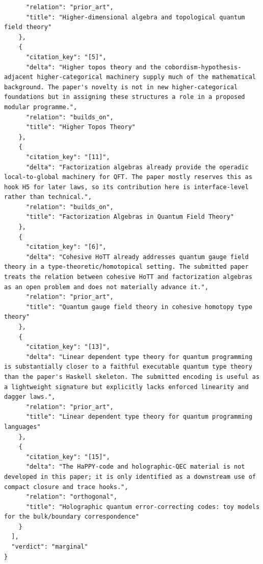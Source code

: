 \documentclass[11pt]{article}
\begin{document}
\begin{verbatim}
      "relation": "prior_art",
      "title": "Higher-dimensional algebra and topological quantum field theory"
    },
    {
      "citation_key": "[5]",
      "delta": "Higher topos theory and the cobordism-hypothesis-adjacent higher-categorical machinery supply much of the mathematical background. The paper's novelty is not in new higher-categorical foundations but in assigning these structures a role in a proposed modular programme.",
      "relation": "builds_on",
      "title": "Higher Topos Theory"
    },
    {
      "citation_key": "[11]",
      "delta": "Factorization algebras already provide the operadic local-to-global machinery for QFT. The paper mostly reserves this as hook H5 for later laws, so its contribution here is interface-level rather than technical.",
      "relation": "builds_on",
      "title": "Factorization Algebras in Quantum Field Theory"
    },
    {
      "citation_key": "[6]",
      "delta": "Cohesive HoTT already addresses quantum gauge field theory in a type-theoretic/homotopical setting. The submitted paper treats the relation between cohesive HoTT and factorization algebras as an open problem and does not materially advance it.",
      "relation": "prior_art",
      "title": "Quantum gauge field theory in cohesive homotopy type theory"
    },
    {
      "citation_key": "[13]",
      "delta": "Linear dependent type theory for quantum programming is substantially closer to a faithful executable quantum type theory than the paper's Haskell skeleton. The submitted encoding is useful as a lightweight signature but explicitly lacks enforced linearity and dagger laws.",
      "relation": "prior_art",
      "title": "Linear dependent type theory for quantum programming languages"
    },
    {
      "citation_key": "[15]",
      "delta": "The HaPPY-code and holographic-QEC material is not developed in this paper; it is only identified as a downstream use of compact closure and trace hooks.",
      "relation": "orthogonal",
      "title": "Holographic quantum error-correcting codes: toy models for the bulk/boundary correspondence"
    }
  ],
  "verdict": "marginal"
}
\end{verbatim}
\end{document}
